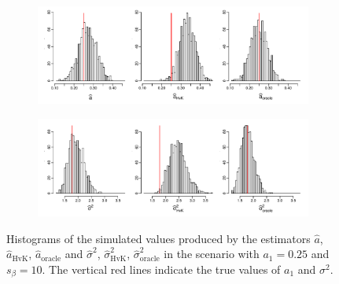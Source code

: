 \begin{figure}[t!]
\centering
\begin{subfigure}[b]{\textwidth}
\includegraphics[width=\textwidth]{Plots/a_hat_histograms_a1=25_T=500_slope=10_(q,r,M1,M2)=(25,10,20,30).pdf}
\end{subfigure}
\begin{subfigure}[b]{\textwidth}
\includegraphics[width=\textwidth]{Plots/lrv_histograms_a1=25_T=500_slope=10_(q,r,M1,M2)=(25,10,20,30).pdf}
\end{subfigure}
\caption{Histograms of the simulated values produced by the estimators $\widehat{a}$, $\widehat{a}_{\text{HvK}}$, $\widehat{a}_{\text{oracle}}$ and $\widehat{\sigma}^2$, $\widehat{\sigma}^2_{\text{HvK}}$, $\widehat{\sigma}^2_{\text{oracle}}$ in the scenario with $a_1 = 0.25$ and $s_\beta = 10$. The vertical red lines indicate the true values of $a_1$ and $\sigma^2$.}\label{fig:hist_scenario2} 
\end{figure}


